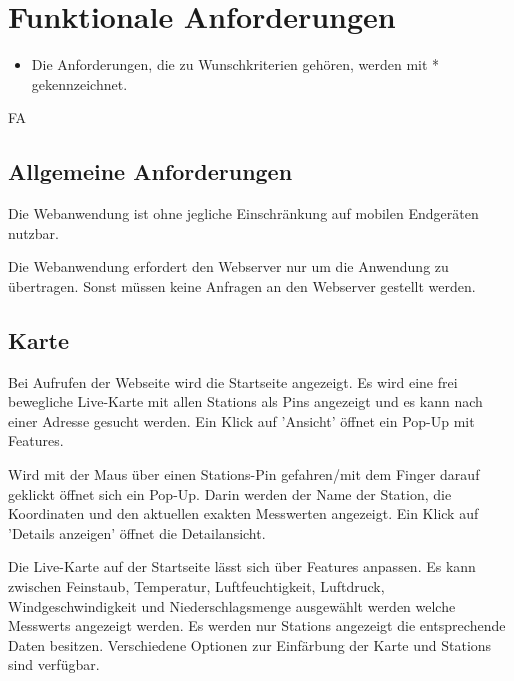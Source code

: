 \section{Funktionale Anforderungen}

\begin{itemize}
  \item Die Anforderungen, die zu Wunschkriterien gehören, werden mit * gekennzeichnet.
\end{itemize}

\setcounter{counter}{10}
\begin{Kriterien}{FA}

\subsection{Allgemeine Anforderungen}

 \item[Unterstützung mobile Endgeräte]
   Die \gls{Webanwendung} ist ohne jegliche Einschränkung auf mobilen Endgeräten nutzbar.  

 \item[Statische Webanwendung]
   Die \gls{Webanwendung} erfordert den \gls{Webserver} nur um die Anwendung zu übertragen.
   Sonst müssen keine Anfragen an den \gls{Webserver} gestellt werden. 

\subsection{Karte}

 \item[Startseite]
   Bei Aufrufen der Webseite wird die Startseite angezeigt.
   Es wird eine frei bewegliche \gls{Live-Karte} mit allen \glspl{Station} als \glspl{Pin} angezeigt und es kann nach einer Adresse gesucht werden.
   Ein Klick auf 'Ansicht' öffnet ein \gls{Pop-Up} mit \glspl{Feature}.

 \item[Stationen Pop-Up]
  Wird mit der Maus über einen Stations-\gls{Pin} gefahren/mit dem Finger darauf geklickt öffnet sich ein \gls{Pop-Up}.
  Darin werden der Name der \gls{Station}, die Koordinaten und den aktuellen exakten Messwerten angezeigt.
  Ein Klick auf 'Details anzeigen' öffnet die \gls{Detailansicht}.

 \item[Features]
   Die \gls{Live-Karte} auf der Startseite lässt sich über \glspl{Feature} anpassen.
   Es kann zwischen Feinstaub, Temperatur, Luftfeuchtigkeit, Luftdruck, Windgeschwindigkeit und Niederschlagsmenge ausgewählt werden welche \glspl{Messwert} angezeigt werden.
   Es werden nur \glspl{Station} angezeigt die entsprechende Daten besitzen.
   Verschiedene Optionen zur Einfärbung der Karte und \glspl{Station} sind verfügbar.


\end{Kriterien}

